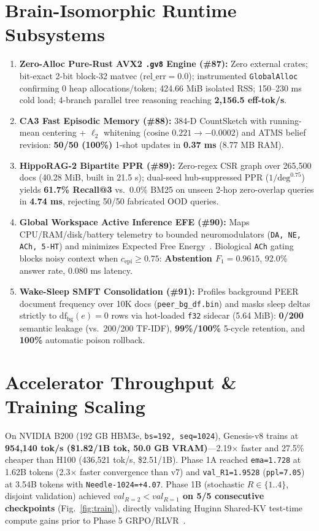 \documentclass[10pt,twocolumn,letterpaper]{article}
\begin{document}
\section{Brain-Isomorphic Runtime Subsystems}
\begin{enumerate}[leftmargin=*,nosep]
\item \textbf{Zero-Alloc Pure-Rust AVX2 \texttt{.gv8} Engine (\#87):} Zero external crates; bit-exact 2-bit block-32 matvec ($\text{rel\_err}=0.0$); instrumented \texttt{GlobalAlloc} confirming 0 heap allocations/token; 424.66 MiB isolated RSS; 150--230 ms cold load; 4-branch parallel tree reasoning reaching \textbf{2,156.5 eff-tok/s}.
\item \textbf{CA3 Fast Episodic Memory (\#88):} 384-D CountSketch with running-mean centering + $\ell_2$ whitening (cosine $0.221\to -0.0002$) and ATMS belief revision: \textbf{50/50 (100\%)} 1-shot updates in \textbf{0.37 ms} (8.77 MB RAM).
\item \textbf{HippoRAG-2 Bipartite PPR (\#89):} Zero-regex CSR graph over 265,500 docs (40.28 MiB, built in 21.5 s); dual-seed hub-suppressed PPR ($1/\text{deg}^{0.75}$) yields \textbf{61.7\% Recall@3} vs.\ 0.0\% BM25 on unseen 2-hop zero-overlap queries in \textbf{4.74 ms}, rejecting 50/50 fabricated OOD queries.
\item \textbf{Global Workspace Active Inference EFE (\#90):} Maps CPU/RAM/disk/battery telemetry to bounded neuromodulators (\texttt{DA, NE, ACh, 5-HT}) and minimizes Expected Free Energy~\cite{friston2017active}. Biological \texttt{ACh} gating blocks noisy context when $c_{\text{epi}}\ge 0.75$: \textbf{Abstention $F_1=0.9615$}, 92.0\% answer rate, 0.080 ms latency.
\item \textbf{Wake-Sleep SMFT Consolidation (\#91):} Profiles background PEER document frequency over 10K docs (\texttt{peer\_bg\_df.bin}) and masks sleep deltas strictly to $\text{df}_{\text{bg}}(e)=0$ rows via hot-loaded \texttt{f32} sidecar (5.64 MiB): \textbf{0/200} semantic leakage (vs.\ 200/200 TF-IDF), \textbf{99\%/100\%} 5-cycle retention, and \textbf{100\%} automatic poison rollback.
\end{enumerate}

\section{Accelerator Throughput & Training Scaling}
On NVIDIA B200 (192 GB HBM3e, \texttt{bs=192, seq=1024}), Genesis-v8 trains at \textbf{954,140 tok/s (\$1.82/1B tok, 50.0 GB VRAM)}---2.19$\times$ faster and 27.5\% cheaper than H100 (436,521 tok/s, \$2.51/1B). Phase 1A reached \texttt{ema=1.728} at 1.62B tokens (2.3$\times$ faster convergence than v7) and \texttt{val\_R1=1.9528} (\texttt{ppl=7.05}) at 3.54B tokens with \texttt{Needle-1024=+4.07}. Phase 1B (stochastic $R\in\{1..4\}$, disjoint validation) achieved \textbf{$val_{R=2} < val_{R=1}$ on 5/5 consecutive checkpoints} (Fig.~\ref{fig:train}), directly validating Huginn Shared-KV test-time compute gains prior to Phase 5 GRPO/RLVR~\cite{deepseek2025r1}.
\end{document}
